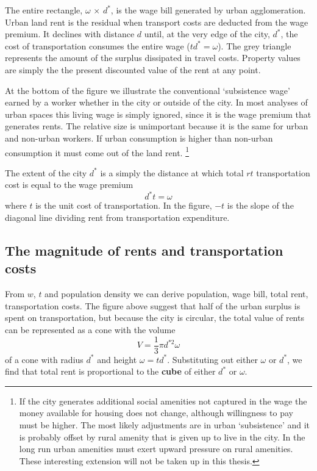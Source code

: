 \begin{figure}
    \begin{center}
    
    \caption{}
    \label{fig-alonzo-simple}
    \end{center}
\end{figure}

The entire rectangle, $\omega$ $\times$ $d^*$, is the wage bill generated by urban agglomeration. Urban land rent is the residual when transport costs are deducted from the wage premium. It declines  with distance $d$ until, at the very edge of the city, $d^*$, the cost of transportation  consumes the entire wage ($td^*=\omega$). The grey triangle represents the amount of the surplus dissipated in travel costs.  Property values are simply the the present discounted value of the rent at any point.

At the bottom of the figure we illustrate the conventional `subsistence wage'  earned by a worker whether in the city or outside of the city.   In most analyses of urban spaces this living wage is simply ignored, since it is the wage premium that generates rents.  The relative size is unimportant because it is the same for urban and non-urban workers. If urban consumption is higher than non-urban consumption it must come out of the land rent.
\footnote{If the city generates additional social amenities not captured in the wage  the money available for housing does not change, although willingness to pay must be higher.  The  most likely adjustments are in urban `subsistence' and it is probably offset by rural amenity that is given up to live in the city. In the long run urban amenities must exert upward pressure on rural amenities. These interesting extension will not be taken up in this thesis. }

The extent  of the city  $d^*$ is a simply the distance at which total $rt$ transportation cost  is equal to the wage premium
\[d^* t= \omega\]
where $t$ is the unit cost of transportation. In the figure, $-t$ is the slope of the diagonal line dividing rent from transportation expenditure.


 \subsection{The magnitude of rents and transportation costs}
 From $w$, $t$ and population density we can derive population, wage bill, total rent, transportation costs. The figure above suggest that  half of the urban surplus is spent on transportation, but because the city is circular, the total value of rents can be represented as  a cone with the volume  \[ V=\frac{1}{3}\pi  d^{*2} \omega \]
of a cone with radius $d^*$ and  height $\omega = td^*$. Substituting out either  $\omega$ or  $d^*$, we find that total rent is  proportional to the \textbf{cube} of either  $d^*$ or $\omega$. 

